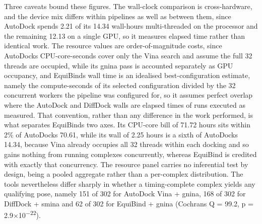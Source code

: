 Three caveats bound these figures. The wall-clock comparison is cross-hardware, and the device mix differs within pipelines as well as between them, since AutoDock spends 2.21 of its 14.34 wall-hours multi-threaded on the processor and the remaining 12.13 on a single GPU, so it measures elapsed time rather than identical work. The resource values are order-of-magnitude costs, since AutoDock\textquotesingle s CPU-core-seconds cover only the Vina search and assume the full 32 threads are occupied, while its gnina pass is accounted separately as GPU occupancy, and EquiBind\textquotesingle s wall time is an idealised best-configuration estimate, namely the compute-seconds of its selected configuration divided by the 32 concurrent workers the pipeline was configured for, so it assumes perfect overlap where the AutoDock and DiffDock walls are elapsed times of runs executed as measured. That convention, rather than any difference in the work performed, is what separates EquiBind\textquotesingle s two axes. Its CPU-core bill of 71.72 hours sits within 2\% of AutoDock\textquotesingle s 70.61, while its wall of 2.25 hours is a sixth of AutoDock\textquotesingle s 14.34, because Vina already occupies all 32 threads within each docking and so gains nothing from running complexes concurrently, whereas EquiBind is credited with exactly that concurrency. The resource panel carries no inferential test by design, being a pooled aggregate rather than a per-complex distribution. The tools nevertheless differ sharply in whether a timing-complete complex yields any qualifying pose, namely 151 of 302 for AutoDock Vina + gnina, 168 of 302 for DiffDock + smina and 62 of 302 for EquiBind + gnina (Cochran\textquotesingle s Q = 99.2, p = 2.9\ensuremath{\times}10\textsuperscript{\ensuremath{-}22}).

